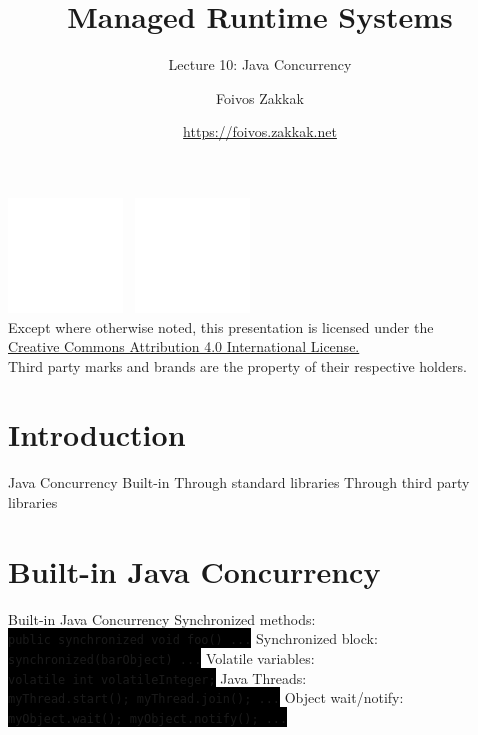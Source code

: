 \documentclass[
14pt,
aspectratio=169,
usenames,
dvipsnames,
x11names]{beamer}
\title{Managed Runtime Systems}
\subtitle{Lecture 10: Java Concurrency}
\author[\url{https://foivos.zakkak.net}]{Foivos Zakkak}
\date{\url{https://foivos.zakkak.net}}
\newcommand{\code}[1]{{\colorbox{black}{\color{green}\texttt{#1}}}}
\begin{document}


\begin{frame}[plain]
  \titlepage
  \centering
  \includegraphics[height=.75cm]{cc}~
  \includegraphics[height=.75cm]{by}\\[1em]
  \scriptsize{Except where otherwise noted, this presentation is licensed under the\\
    \href{http://creativecommons.org/licenses/by/4.0/}%
    {Creative Commons Attribution 4.0 International License.}\\[1ex]
    Third party marks and brands are the property of their respective
    holders.}
\end{frame}


\section{Introduction}

\begin{frame}{Java Concurrency}
  Built-in
  \vfill
  Through standard libraries
  \vfill
  Through third party libraries
\end{frame}

\section{Built-in Java Concurrency}

\begin{frame}{Built-in Java Concurrency}
  Synchronized methods:\\
  \code{public synchronized void foo() {...}}
  \vfill
  Synchronized block:\\
  \code{synchronized(barObject) {...}}
  \vfill
  Volatile variables:\\
  \code{volatile int volatileInteger;}
  \vfill
  Java Threads:\\
  \code{myThread.start(); myThread.join(); ...}
  \vfill
  Object wait/notify:\\
  \code{myObject.wait(); myObject.notify(); ...}
\end{frame}
\end{document}
